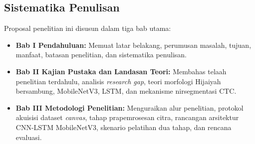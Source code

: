 \documentclass[conference]{IEEEtran}
\begin{document}
\subsection{Sistematika Penulisan}
Proposal penelitian ini disusun dalam tiga bab utama:
\begin{itemize}
    \item \textbf{Bab I Pendahuluan:} Memuat latar belakang, perumusan masalah, tujuan, manfaat, batasan penelitian, dan sistematika penulisan.
    \item \textbf{Bab II Kajian Pustaka dan Landasan Teori:} Membahas telaah penelitian terdahulu, analisis \textit{research gap}, teori morfologi Hijaiyah bersambung, MobileNetV3, LSTM, dan mekanisme nirsegmentasi CTC.
    \item \textbf{Bab III Metodologi Penelitian:} Menguraikan alur penelitian, protokol akuisisi dataset \textit{canvas}, tahap prapemrosesan citra, rancangan arsitektur CNN-LSTM MobileNetV3, skenario pelatihan dua tahap, dan rencana evaluasi.
\end{itemize}
\end{document}

